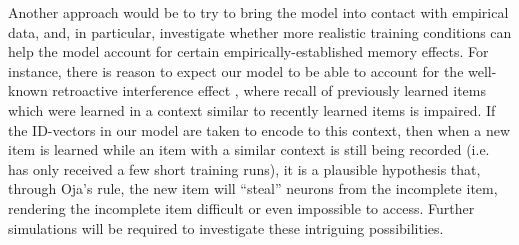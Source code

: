 \documentclass[10pt,letterpaper]{article}
\begin{document}
Another approach would be to try to bring the model into contact with empirical data, and, in particular, investigate whether more realistic training conditions can help the model account for certain empirically-established memory effects. For instance, there is reason to expect our model to be able to account for the well-known retroactive interference effect \citep{Levy-Gigi}, where recall of previously learned items which were learned in a context similar to recently learned items is impaired. If the ID-vectors in our model are taken to encode to this context, then when a new item is learned while an item with a similar context is still being recorded (i.e. has only received a few short training runs), it is a plausible hypothesis that, through Oja's rule, the new item will ``steal'' neurons from the incomplete item, rendering the incomplete item difficult or even impossible to access. Further simulations will be required to investigate these intriguing possibilities.



\end{document}

